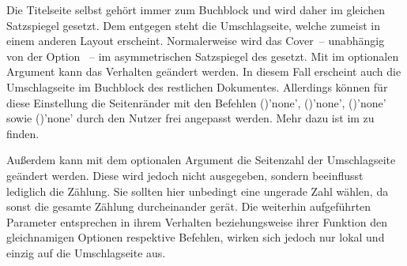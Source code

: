 \begin{Declaration*}{}
\begin{Declaration*}{}
\begin{Declaration*}{}
\begin{Declaration}
\begin{Declaration}[v2.02]{%
}
\begin{Declaration}{}
\begin{Declaration}[v2.02]{}{%
}
\begin{Declaration}[v2.03]{}{%
}
\begin{Declaration}[v2.03]{}{%
}
\begin{Declaration}[v2.03]{%
}{}
\begin{Declaration}[v2.03]{%
}{}
\begin{Declaration}[v2.03]{}{%
}
\begin{Declaration}[v2.03]{}{%
}
\begin{Declaration}[v2.03]{}{%
}
Die Titelseite selbst gehört immer zum Buchblock und wird daher im gleichen 
Satzspiegel gesetzt. Dem entgegen steht die Umschlagseite, welche zumeist in 
einem anderen Layout erscheint. Normalerweise wird das Cover~-- unabhängig von 
der Option ~-- im asymmetrischen Satzspiegel des \CDs 
gesetzt. Mit  im optionalen Argument 
kann das Verhalten geändert werden. In diesem Fall erscheint auch die 
Umschlagseite im Buchblock des restlichen Dokumentes. Allerdings können für 
diese Einstellung die Seitenränder mit den Befehlen 
()'none', 
()'none', 
()'none' sowie 
()'none' 
durch den Nutzer frei angepasst werden. Mehr dazu ist im \scrguide zu finden.

Außerdem kann mit dem optionalen Argument die Seitenzahl der Umschlagseite 
geändert werden. Diese wird jedoch nicht ausgegeben, sondern beeinflusst 
lediglich die Zählung. Sie sollten hier unbedingt eine ungerade Zahl wählen, da 
sonst die gesamte Zählung durcheinander gerät. Die weiterhin aufgeführten 
Parameter entsprechen in ihrem Verhalten beziehungsweise ihrer Funktion den 
gleichnamigen Optionen respektive Befehlen, wirken sich jedoch nur lokal und 
einzig auf die Umschlagseite aus.
%
\end{Declaration}
\end{Declaration}
\end{Declaration}
\end{Declaration}
\end{Declaration}
\end{Declaration}
\end{Declaration}
\end{Declaration}
\end{Declaration}
\end{Declaration}
\end{Declaration}


\end{Declaration*}
\end{Declaration*}
\end{Declaration*}
